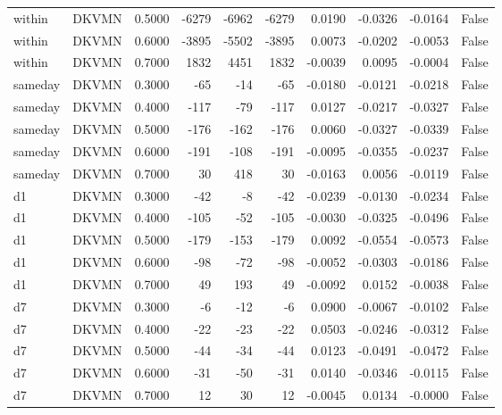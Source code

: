 \begin{tabular}{llrrrrrrrr}
within & DKVMN & 0.5000 & -6279 & -6962 & -6279 & 0.0190 & -0.0326 & -0.0164 & False \\
within & DKVMN & 0.6000 & -3895 & -5502 & -3895 & 0.0073 & -0.0202 & -0.0053 & False \\
within & DKVMN & 0.7000 & 1832 & 4451 & 1832 & -0.0039 & 0.0095 & -0.0004 & False \\
sameday & DKVMN & 0.3000 & -65 & -14 & -65 & -0.0180 & -0.0121 & -0.0218 & False \\
sameday & DKVMN & 0.4000 & -117 & -79 & -117 & 0.0127 & -0.0217 & -0.0327 & False \\
sameday & DKVMN & 0.5000 & -176 & -162 & -176 & 0.0060 & -0.0327 & -0.0339 & False \\
sameday & DKVMN & 0.6000 & -191 & -108 & -191 & -0.0095 & -0.0355 & -0.0237 & False \\
sameday & DKVMN & 0.7000 & 30 & 418 & 30 & -0.0163 & 0.0056 & -0.0119 & False \\
d1 & DKVMN & 0.3000 & -42 & -8 & -42 & -0.0239 & -0.0130 & -0.0234 & False \\
d1 & DKVMN & 0.4000 & -105 & -52 & -105 & -0.0030 & -0.0325 & -0.0496 & False \\
d1 & DKVMN & 0.5000 & -179 & -153 & -179 & 0.0092 & -0.0554 & -0.0573 & False \\
d1 & DKVMN & 0.6000 & -98 & -72 & -98 & -0.0052 & -0.0303 & -0.0186 & False \\
d1 & DKVMN & 0.7000 & 49 & 193 & 49 & -0.0092 & 0.0152 & -0.0038 & False \\
d7 & DKVMN & 0.3000 & -6 & -12 & -6 & 0.0900 & -0.0067 & -0.0102 & False \\
d7 & DKVMN & 0.4000 & -22 & -23 & -22 & 0.0503 & -0.0246 & -0.0312 & False \\
d7 & DKVMN & 0.5000 & -44 & -34 & -44 & 0.0123 & -0.0491 & -0.0472 & False \\
d7 & DKVMN & 0.6000 & -31 & -50 & -31 & 0.0140 & -0.0346 & -0.0115 & False \\
d7 & DKVMN & 0.7000 & 12 & 30 & 12 & -0.0045 & 0.0134 & -0.0000 & False \\
\bottomrule
\end{tabular}
